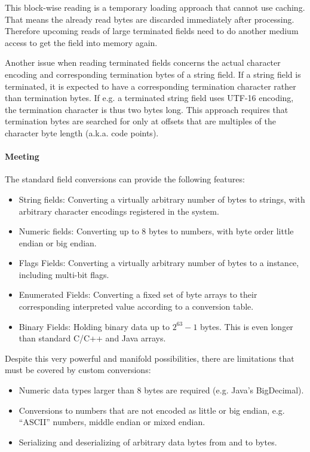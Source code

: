 This block-wise reading is a temporary loading approach that cannot use caching. That means the already read bytes are discarded immediately after processing. Therefore upcoming reads of large terminated fields need to do another medium access to get the field into memory again.

Another issue when reading terminated fields concerns the actual character encoding and corresponding termination bytes of a string field. If a string field is terminated, it is expected to have a corresponding termination character rather than termination bytes. If e.g. a terminated string field uses UTF-16 encoding, the termination character is thus two bytes long. This approach requires that termination bytes are searched for only at offsets that are multiples of the character byte length (a.k.a. code points).


\paragraph{Meeting \REQUfieldCustomConversions{}}
\label{sec:MeetingREQUfieldCustomConversions1}

The standard field conversions can provide the following features:
\begin{itemize}
	\item String fields: Converting a virtually arbitrary number of bytes to strings, with arbitrary character encodings registered in the system.
	\item Numeric fields: Converting up to 8 bytes to numbers, with byte order little endian or big endian.
	\item Flags Fields: Converting a virtually arbitrary number of bytes to a \CLASSflags{} instance, including multi-bit flags.
	\item Enumerated Fields: Converting a fixed set of byte arrays to their corresponding interpreted value according to a conversion table.
	\item Binary Fields: Holding binary data up to $2^{63}-1$ bytes. This is even longer than standard C/C++ and Java arrays.
\end{itemize}

Despite this very powerful and manifold possibilities, there are limitations that must be covered by custom conversions:
\begin{itemize}
	\item Numeric data types larger than 8 bytes are required (e.g. Java's BigDecimal).
	\item Conversions to numbers that are not encoded as little or big endian, e.g. ``ASCII'' numbers, middle endian or mixed endian.
	\item Serializing and deserializing of arbitrary data bytes from and to bytes.
\end{itemize}

